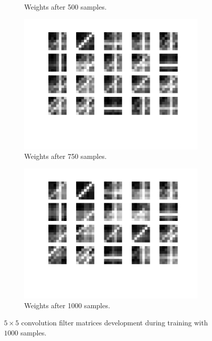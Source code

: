 \begin{figure}[h!]
\begin{subfigure}[t]{.45\textwidth}
  		\caption{Weights after 500 samples.}
  		\label{fig:sub2}
	\end{subfigure}
	\begin{subfigure}[t]{.45\textwidth}
  		\centering
  		\includegraphics[width=.9\linewidth]{imgs/7x7/w4.png}
  		\caption{Weights after 750 samples.}
  		\label{fig:sub2}
	\end{subfigure}
	\begin{subfigure}[t]{.45\textwidth}
  		\centering
  		\includegraphics[width=.9\linewidth]{imgs/7x7/w5.png}
  		\caption{Weights after 1000 samples.}
  		\label{fig:sub2}
	\end{subfigure}
	\caption{$5 \times 5$ convolution filter matrices development during training with $1000$ samples.}
	\label{fig:stripes}
\end{figure}



